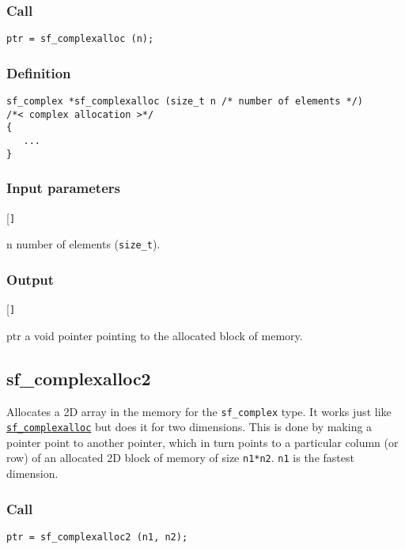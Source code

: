 \subsubsection*{Call}
\begin{verbatim}ptr = sf_complexalloc (n);\end{verbatim}

\subsubsection*{Definition}
\begin{verbatim}
sf_complex *sf_complexalloc (size_t n /* number of elements */) 
/*< complex allocation >*/
{
   ...
}
\end{verbatim}

\subsubsection*{Input parameters}
\begin{desclist}{\tt }{\quad}[\tt ]
   \setlength\itemsep{0pt}
   \item[n] number of elements (\texttt{size\_t}).
\end{desclist}

\subsubsection*{Output}
\begin{desclist}{\tt }{\quad}[\tt ]
   \setlength\itemsep{0pt}
   \item[ptr] a void pointer pointing to the allocated block of memory.
\end{desclist}




\subsection{{sf\_complexalloc2}}\label{sec:sf_complexalloc2}
Allocates a 2D array in the memory for the  \texttt{sf\_complex} type. It works just like \hyperref[sec:sf_complexalloc]{\texttt{sf\_complexalloc}} but does it for two dimensions. This is done by making a pointer point to another pointer, which in turn points to a particular column (or row) of an allocated 2D block of memory of size \texttt{n1*n2}. \texttt{n1} is the fastest dimension.

\subsubsection*{Call}
\begin{verbatim}ptr = sf_complexalloc2 (n1, n2);\end{verbatim}

